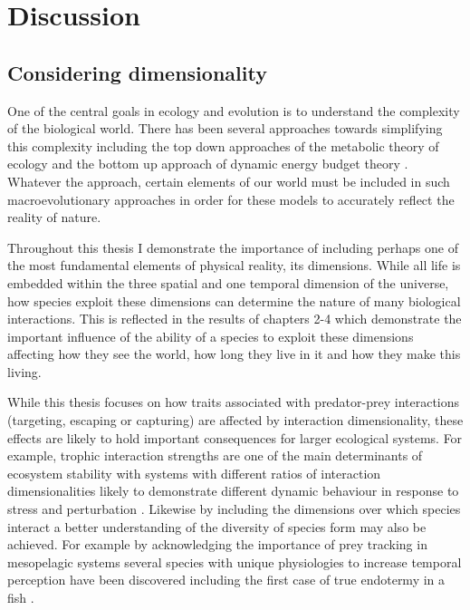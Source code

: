 \chapter{Discussion}
\label{chap:discussion}


\section{Considering dimensionality}

One of the central goals in ecology and evolution is to understand the complexity of the biological world. There has been several approaches towards simplifying this complexity including the top down approaches of the metabolic theory of ecology \citep{brown2004} and the bottom up approach of dynamic energy budget theory \citep{kooijman2009dynamic}. Whatever the approach, certain elements of our world must be included in such macroevolutionary approaches in order for these models to accurately reflect the reality of nature. 


Throughout this thesis I demonstrate the importance of including perhaps one of the most fundamental elements of physical reality, its dimensions. While all life is embedded within the three spatial and one temporal dimension of the universe, how species exploit these dimensions can determine the nature of many biological interactions. This is reflected in the results of chapters 2-4 which demonstrate the important influence of the ability of a species to exploit these dimensions affecting how they see the world, how long they live in it and how they make this living. 


While this thesis focuses on how traits associated with predator-prey interactions (targeting, escaping or capturing) are affected by interaction dimensionality, these effects are likely to hold important consequences for larger ecological systems. For example, trophic interaction strengths are one of the main determinants of ecosystem stability \citep{may1972will,pimm1984complexity} with systems with different ratios of interaction dimensionalities likely to demonstrate different dynamic behaviour in response to stress and perturbation \citep{donohue2013dimensionality}. Likewise by including the dimensions over which species interact a better understanding of the diversity of species form may also be achieved. For example by acknowledging the importance of prey tracking in mesopelagic systems several species with unique physiologies to increase temporal perception have been discovered \citep{fritsches2005warm,frank2012light,landgren2014visual} including the first case of true endotermy in a fish \citep{Wegner15052015}.


